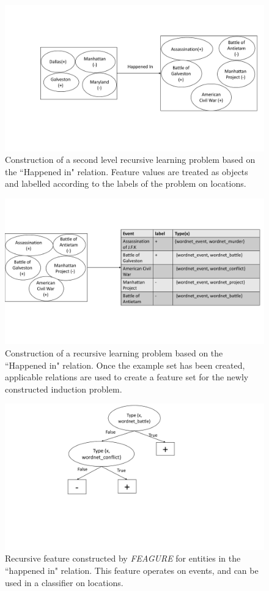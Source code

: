 \documentclass[twoside,11pt]{article}
\theoremstyle{definition}
\begin{document}
\begin{figure}[!h]
	\centering
	\includegraphics[width=0.7\linewidth]{figure_rec3_example_rec_new}
	\caption{Construction of a second level recursive learning problem based on the ``Happened in" relation. Feature values are treated as objects and labelled according to the labels of the problem on locations.}
	\label{fig:figure_rec3_example_rec}
\end{figure}

\begin{figure}[!h]
	\centering
	\includegraphics[width=\linewidth]{figure_rec3_problem_rec_new}
	\caption{Construction of a recursive learning problem based on the ``Happened in" relation. Once the example set has been created, applicable relations are used to create a feature set for the newly constructed induction problem.}
	\label{fig:figure_rec3_problem_rec}
\end{figure}

\begin{figure}[!h]
	\centering
	\includegraphics[width=0.4\linewidth]{figure_rec3_feature_rec_new}
	\caption{Recursive feature constructed by \emph{FEAGURE} for entities in the ``happened in" relation. This feature operates on events, and can be used in a classifier on locations.}
	\label{fig:figure_rec3_feature}
\end{figure}
\end{document}
